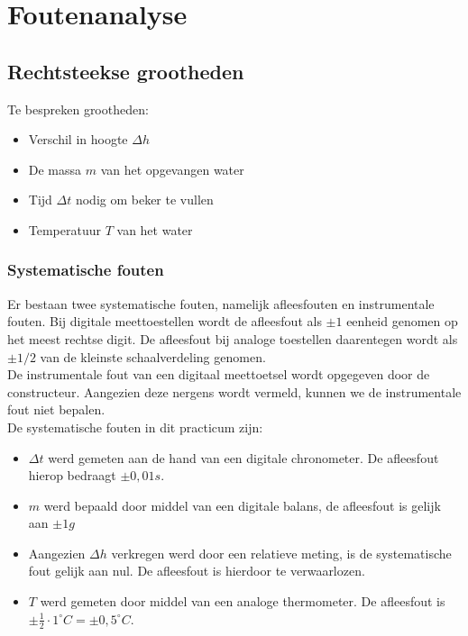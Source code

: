 \section{Foutenanalyse}

\subsection{Rechtsteekse grootheden}

Te bespreken grootheden:
\begin{itemize}
    \item Verschil in hoogte $\Delta h$
    \item De massa $m$ van het opgevangen water
    \item Tijd $\Delta t$ nodig om beker te vullen
    \item Temperatuur $T$ van het water
\end{itemize}

\subsubsection{Systematische fouten}
Er bestaan twee systematische fouten, namelijk afleesfouten en instrumentale fouten. Bij digitale meettoestellen wordt de afleesfout als $\pm 1$ eenheid genomen op het meest rechtse digit. 
De afleesfout bij analoge toestellen daarentegen wordt als $\pm 1/2$ van de kleinste schaalverdeling genomen. 
\\

De instrumentale fout van een digitaal meettoetsel wordt opgegeven door de constructeur. Aangezien deze nergens wordt vermeld, kunnen we de instrumentale fout niet bepalen.
\\

De systematische fouten in dit practicum zijn:

\begin{itemize}
    \item $\Delta t$ werd gemeten aan de hand van een digitale chronometer. De afleesfout hierop bedraagt $\pm 0,01 s$.
    \item $m$ werd bepaald door middel van een digitale balans, de afleesfout is gelijk aan $\pm 1g$
    \item Aangezien $\Delta h$ verkregen werd door een relatieve meting, is de systematische fout gelijk aan nul. De afleesfout is hierdoor te verwaarlozen.
    \item $T$ werd gemeten door middel van een analoge thermometer. De afleesfout is $\pm \frac{1}{2} \cdot 1^{\circ}C = \pm 0,5^{\circ}C$.
\end{itemize} 

